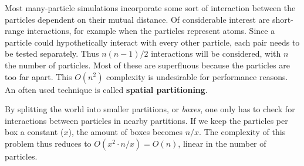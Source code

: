 Most many-particle simulations incorporate some sort of interaction between the 
particles dependent on their mutual distance. Of considerable interest are 
short-range interactions, for example when the particles represent atoms. Since 
a particle could hypothetically interact with every other particle, each pair 
needs to be tested separately. Thus $n(n-1)/2$ interactions will be considered, 
with $n$ the number of particles. Most of these are superfluous because the 
particles are too far apart. This $O(n^2)$ complexity is undesirable for 
performance reasons.  An often used technique is called \textbf{spatial 
partitioning}.

By splitting the world into smaller partitions, or \emph{boxes}, one only 
has to check for interactions between particles in nearby partitions. If we 
keep the particles per box a constant ($x$), the amount of boxes becomes 
$n/x$. The complexity of this problem thus reduces to $O(x^2 \cdot n/x) = 
O(n)$, linear in the number of particles.
